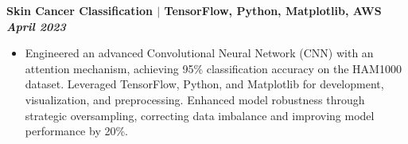 \documentclass{article}
\begin{document}
\noindent \textbf{Skin Cancer Classification $\mid$ TensorFlow, Python, Matplotlib, AWS} \textit{\hfill \textbf{April 2023}}
\begin{itemize}[noitemsep,nolistsep,leftmargin=*]
\item {\small Engineered an advanced Convolutional Neural Network (CNN) with an attention mechanism, achieving 95\% classification accuracy on the HAM1000 dataset. Leveraged TensorFlow, Python, and Matplotlib for development, visualization, and preprocessing. Enhanced model robustness through strategic oversampling, correcting data imbalance and improving model performance by 20\%.}
\end{itemize}




\end{document}
